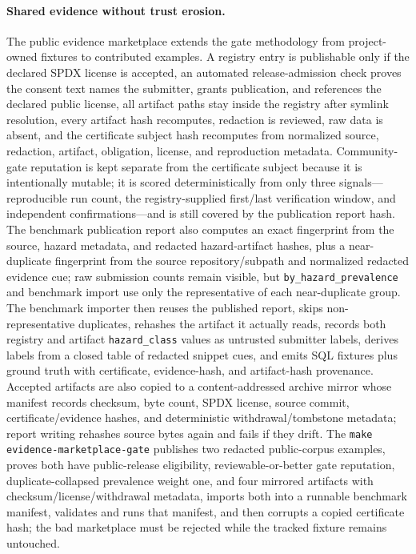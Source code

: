 \documentclass[11pt]{article}
\newcommand{\code}[1]{\texttt{#1}}
\newcommand{\gate}[1]{\texttt{make #1}}
\begin{document}
\paragraph{Shared evidence without trust erosion.} The public evidence marketplace extends the gate
methodology from project-owned fixtures to contributed examples. A registry entry is publishable only
if the declared SPDX license is accepted, an automated release-admission check proves the consent text
names the submitter, grants publication, and references the declared public license, all artifact paths
stay inside the registry after symlink resolution, every artifact hash recomputes, redaction is
reviewed, raw data is absent, and the certificate subject hash recomputes from normalized source,
redaction, artifact, obligation, license, and reproduction metadata. Community-gate reputation is kept
separate from the certificate subject because it is intentionally mutable; it is scored deterministically
from only three signals---reproducible run count, the registry-supplied first/last verification window,
and independent confirmations---and is still covered by the publication report hash. The benchmark
publication report also computes an exact fingerprint from the source, hazard metadata, and redacted
hazard-artifact hashes, plus a near-duplicate fingerprint from the source repository/subpath and
normalized redacted evidence cue; raw submission counts remain visible, but
\code{by\_hazard\_prevalence} and benchmark import use only the representative of each near-duplicate
group. The benchmark importer then reuses the published report, skips non-representative duplicates,
rehashes the artifact it actually reads, records both registry and artifact \code{hazard\_class} values
as untrusted submitter labels, derives labels from a closed table of redacted snippet cues, and emits
SQL fixtures plus ground truth with certificate, evidence-hash, and artifact-hash provenance. Accepted
artifacts are also copied to a content-addressed archive mirror whose manifest records checksum, byte
count, SPDX license, source commit, certificate/evidence hashes, and deterministic withdrawal/tombstone
metadata; report writing rehashes source bytes again and fails if they drift. The
\gate{evidence-marketplace-gate} publishes two redacted public-corpus examples, proves both have
public-release eligibility, reviewable-or-better gate reputation, duplicate-collapsed prevalence weight
one, and four mirrored artifacts with checksum/license/withdrawal metadata, imports both into a runnable
benchmark manifest, validates and runs that manifest, and then corrupts a copied certificate hash; the
bad marketplace must be rejected while the tracked fixture remains untouched.
\end{document}
